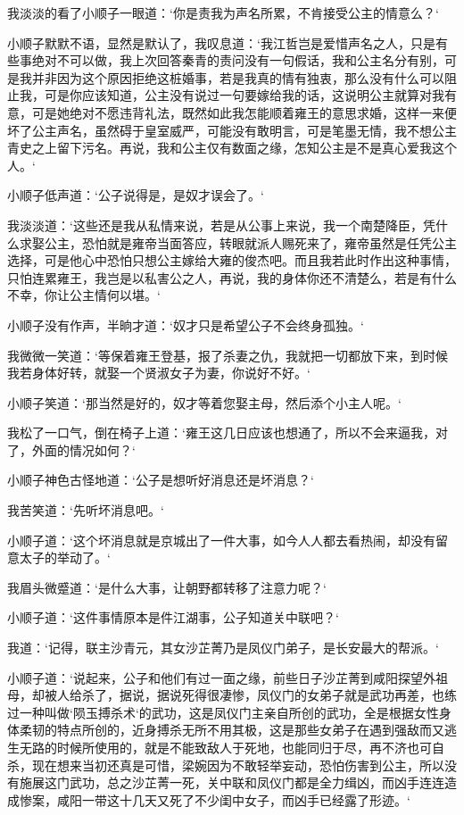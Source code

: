 我淡淡的看了小顺子一眼道：‘你是责我为声名所累，不肯接受公主的情意么？‘

小顺子默默不语，显然是默认了，我叹息道：‘我江哲岂是爱惜声名之人，只是有些事绝对不可以做，我上次回答秦青的责问没有一句假话，我和公主名分有别，可是我并非因为这个原因拒绝这桩婚事，若是我真的情有独衷，那么没有什么可以阻止我，可是你应该知道，公主没有说过一句要嫁给我的话，这说明公主就算对我有意，可是她绝对不愿违背礼法，既然如此我怎能顺着雍王的意思求婚，这样一来便坏了公主声名，虽然碍于皇室威严，可能没有敢明言，可是笔墨无情，我不想公主青史之上留下污名。再说，我和公主仅有数面之缘，怎知公主是不是真心爱我这个人。‘

小顺子低声道：‘公子说得是，是奴才误会了。‘

我淡淡道：‘这些还是我从私情来说，若是从公事上来说，我一个南楚降臣，凭什么求娶公主，恐怕就是雍帝当面答应，转眼就派人赐死来了，雍帝虽然是任凭公主选择，可是他心中恐怕只想公主嫁给大雍的俊杰吧。而且我若此时作出这种事情，只怕连累雍王，我岂是以私害公之人，再说，我的身体你还不清楚么，若是有什么不幸，你让公主情何以堪。‘

小顺子没有作声，半晌才道：‘奴才只是希望公子不会终身孤独。‘

我微微一笑道：‘等保着雍王登基，报了杀妻之仇，我就把一切都放下来，到时候我若身体好转，就娶一个贤淑女子为妻，你说好不好。‘

小顺子笑道：‘那当然是好的，奴才等着您娶主母，然后添个小主人呢。‘

我松了一口气，倒在椅子上道：‘雍王这几日应该也想通了，所以不会来逼我，对了，外面的情况如何？‘

小顺子神色古怪地道：‘公子是想听好消息还是坏消息？‘

我苦笑道：‘先听坏消息吧。‘

小顺子道：‘这个坏消息就是京城出了一件大事，如今人人都去看热闹，却没有留意太子的举动了。‘

我眉头微蹙道：‘是什么大事，让朝野都转移了注意力呢？‘

小顺子道：‘这件事情原本是件江湖事，公子知道关中联吧？‘

我道：‘记得，联主沙青元，其女沙芷菁乃是凤仪门弟子，是长安最大的帮派。‘

小顺子道：‘说起来，公子和他们有过一面之缘，前些日子沙芷菁到咸阳探望外祖母，却被人给杀了，据说，据说死得很凄惨，凤仪门的女弟子就是武功再差，也练过一种叫做‘陨玉搏杀术‘的武功，这是凤仪门主亲自所创的武功，全是根据女性身体柔韧的特点所创的，近身搏杀无所不用其极，这是那些女弟子在遇到强敌而又逃生无路的时候所使用的，就是不能致敌人于死地，也能同归于尽，再不济也可自杀，现在想来当初还真是可惜，梁婉因为不敢轻举妄动，恐怕伤害到公主，所以没有施展这门武功，总之沙芷菁一死，关中联和凤仪门都是全力缉凶，而凶手连连造成惨案，咸阳一带这十几天又死了不少闺中女子，而凶手已经露了形迹。‘


